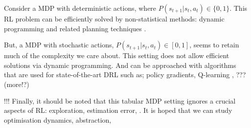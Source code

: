 Consider a MDP with deterministic actions, where $P(s_{t+1}|s_t, a_t) \in \{ 0, 1\}$.
This RL problem can be efficiently solved by non-statistical
methods: dynamic programming and related planning techniques \cite{Bertsekas1995}.

But, a MDP with stochastic actions, $P(s_{t+1}|s_t, a_t) \in [0, 1]$,
seems to retain much of the complexity we care about. This setting does not allow
efficient solutions via dynamic programming. And can be approached with algorithms
that are used for state-of-the-art DRL such as;
policy gradients\cite{Schulman2015a}, Q-learning \cite{Mnih2015}, ??? (more!?)

{\color{red}!!!}
Finally, it should be noted that this tabular MDP setting ignores a crucial
aspects of RL: exploration, estimation error, . It is hoped that we can study
optimisation dynamics,  abstraction,
